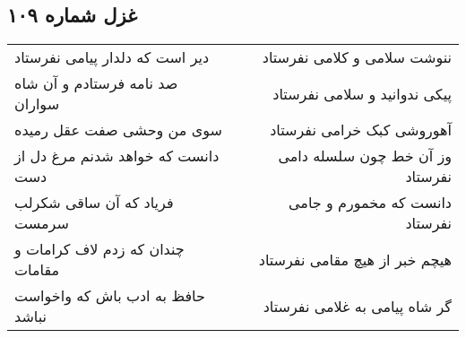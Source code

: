 \begin{center}
\section*{غزل شماره ۱۰۹}
\label{sec:sh109}
\begin{longtable}{l p{0.5cm} r}
دیر است که دلدار پیامی نفرستاد
&&
ننوشت سلامی و کلامی نفرستاد
\\
صد نامه فرستادم و آن شاه سواران
&&
پیکی ندوانید و سلامی نفرستاد
\\
سوی من وحشی صفت عقل رمیده
&&
آهوروشی کبک خرامی نفرستاد
\\
دانست که خواهد شدنم مرغ دل از دست
&&
وز آن خط چون سلسله دامی نفرستاد
\\
فریاد که آن ساقی شکرلب سرمست
&&
دانست که مخمورم و جامی نفرستاد
\\
چندان که زدم لاف کرامات و مقامات
&&
هیچم خبر از هیچ مقامی نفرستاد
\\
حافظ به ادب باش که واخواست نباشد
&&
گر شاه پیامی به غلامی نفرستاد
\\
\end{longtable}
\end{center}
